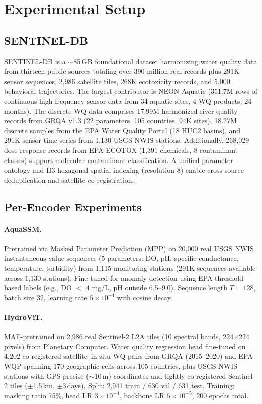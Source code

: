 \section{Experimental Setup}
\label{sec:experiments}

\subsection{SENTINEL-DB}

SENTINEL-DB is a $\sim$85\,GB foundational dataset harmonizing water quality
data from thirteen public sources totaling over 390 million real records plus
291K sensor sequences, 2,986 satellite tiles, 268K ecotoxicity records, and
5,000 behavioral trajectories. The largest contributor is NEON Aquatic
(351.7M rows of continuous high-frequency sensor data from 34 aquatic sites,
4 WQ products, 24 months). The discrete WQ data comprises 17.99M harmonized
river quality records from GRQA v1.3 (22 parameters, 105 countries, 94K
sites), 18.27M discrete samples from the EPA Water Quality Portal (18 HUC2
basins), and 291K sensor time series from 1,130 USGS NWIS stations.
Additionally, 268,029 dose-response records from EPA ECOTOX (1,391
chemicals, 8 contaminant classes) support molecular contaminant
classification. A unified parameter ontology and H3 hexagonal spatial
indexing (resolution 8) enable cross-source deduplication and satellite
co-registration.

\subsection{Per-Encoder Experiments}

\paragraph{AquaSSM.}
Pretrained via Masked Parameter Prediction (MPP) on 20,000 real USGS NWIS
instantaneous-value sequences (5 parameters: DO, pH, specific conductance,
temperature, turbidity) from 1,115 monitoring stations (291K sequences
available across 1,130 stations). Fine-tuned for anomaly detection using
EPA threshold-based labels (e.g., DO $<$ 4 mg/L, pH outside 6.5--9.0).
Sequence length $T=128$, batch size 32, learning rate $5 \times 10^{-4}$
with cosine decay.

\paragraph{HydroViT.}
MAE-pretrained on 2,986 real Sentinel-2 L2A tiles (10 spectral bands,
224$\times$224 pixels) from Planetary Computer. Water quality regression
head fine-tuned on 4,202 co-registered satellite--in situ WQ pairs from
GRQA (2015--2020) and EPA WQP spanning 170 geographic cells across 105
countries, plus USGS NWIS stations with GPS-precise ($\sim$10\,m)
coordinates and tightly co-registered Sentinel-2 tiles ($\pm$1.5\,km,
$\pm$3\,days). Split: 2,941 train / 630 val / 631 test. Training:
masking ratio 75\%, head LR $3 \times 10^{-4}$, backbone LR $5 \times
10^{-5}$, 200 epochs total.

